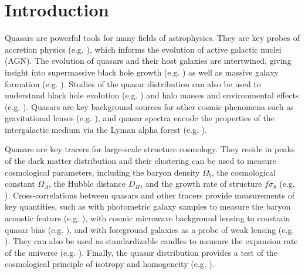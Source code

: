 \section{Introduction}

Quasars are powerful tools for many fields of astrophysics. 
They are key probes of accretion physics (e.g. \citealt{SunyaevZeldovich1970, yu_quasar_2020}), which informs the evolution of active galactic nuclei (AGN). 
The evolution of quasars and their host galaxies are intertwined, giving insight into supermassive black hole growth (e.g. \citealt{hopkins_unified_2006}) as well as massive galaxy formation (e.g. \citealt{kormendy_coevolution_2013}).
Studies of the quasar distribution can also be used to understand black hole evolution (e.g. \citealt{powell_clustering_2020}) and halo masses and environmental effects (e.g. \citealt{dipompeo_characteristic_2017}).
Quasars are  key background sources for other cosmic phenomena such as gravitational lenses (e.g. \citealt{claeskens_gravitational_2002}), and quasar spectra encode the properties of the intergalactic medium via the Lyman alpha forest (e.g. \citealt{rauch_lyman_1998}). 

Quasars are key tracers for large-scale structure cosmology.
They reside in peaks of the dark matter distribution and their clustering can be used to measure cosmological parameters, including the baryon density $\Omega_b$, the cosmological constant $\Omega_\Lambda$, the Hubble distance $D_H$, and the growth rate of structure $f\sigma_8$ (e.g. \citealt{yahata_large-scale_2005, hou_completed_2020}).
Cross-correlations between quasars and other tracers provide measurements of key quantities, such as with photometric galaxy samples to measure the baryon acoustic feature (e.g. \citealt{}), with cosmic microwave background lensing to constrain quasar bias (e.g. \citealt{sherwin_atacama_2012}), and with foreground galaxies as a probe of weak lensing (e.g. \citealt{menard_cosmological_2002, scranton_detection_2005, zarrouk_baryon_2021}).
They can also be used as standardizable candles to measure the expansion rate of the universe (e.g. \citealt{setti_hubble_1973, risaliti_hubble_2015, lusso_quasars_2020}).
Finally, the quasar distribution provides a test of the cosmological principle of isotropy and homogeneity (e.g. \citealt{secrest_test_2021, dam_testing_2022}).

